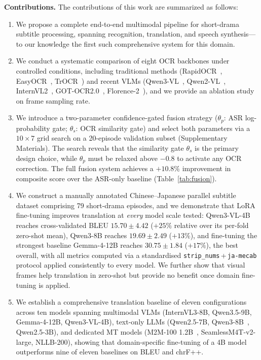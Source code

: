 \documentclass[mathematics,article,submit,xetex,moreauthors]{Definitions/mdpi}
\begin{document}
\textbf{Contributions.}
The contributions of this work are summarized as follows:
\begin{enumerate}
 \item We propose a complete end-to-end multimodal pipeline for short-drama subtitle processing, spanning recognition, translation, and speech synthesis---to our knowledge the first such comprehensive system for this domain.
 \item We conduct a systematic comparison of eight OCR backbones under controlled conditions, including traditional methods (RapidOCR~\cite{rapidocr2022}, EasyOCR~\cite{easyocr2020}, TrOCR~\cite{li2021trocr}) and recent VLMs (Qwen3-VL~\cite{qwen3vl2025}, Qwen2-VL~\cite{wang2024qwen2}, InternVL2~\cite{chen2024internvl}, GOT-OCR2.0~\cite{wang2024gotocr}, Florence-2~\cite{florence2_2024}), and we provide an ablation study on frame sampling rate.
 \item We introduce a two-parameter confidence-gated fusion strategy ($\theta_p$: ASR log-probability gate; $\theta_s$: OCR similarity gate) and select both parameters via a $10 \times 7$ grid search on a 20-episode validation subset (Supplementary Materials). The search reveals that the similarity gate $\theta_s$ is the primary design choice, while $\theta_p$ must be relaxed above $-0.8$ to activate any OCR correction. The full fusion system achieves a $+10.8\%$ improvement in composite score over the ASR-only baseline (Table~\ref{tab:fusion}).
 \item We construct a manually annotated Chinese--Japanese parallel subtitle dataset comprising 79 short-drama episodes, and we demonstrate that LoRA fine-tuning improves translation at \emph{every} model scale tested: Qwen3-VL-4B reaches cross-validated BLEU $15.70\pm4.42$ ($+25\%$ relative over its per-fold zero-shot mean), Qwen3-8B reaches $19.69\pm2.49$ ($+13\%$), and fine-tuning the strongest baseline Gemma-4-12B reaches $30.75\pm1.84$ ($+17\%$), the best overall, with all metrics computed via a standardised \texttt{strip\_nums}\,+\,\allowbreak\texttt{ja-mecab} protocol applied consistently to every model. We further show that visual frames help translation in zero-shot but provide no benefit once domain fine-tuning is applied.
 \item We establish a comprehensive translation baseline of eleven configurations across ten models spanning multimodal VLMs (InternVL3-8B, Qwen3.5-9B, Gemma-4-12B, Qwen3-VL-4B), text-only LLMs (Qwen2.5-7B, Qwen3-8B~\cite{qwen3_2025}, Qwen2.5-3B), and dedicated MT models (M2M-100 1.2B~\cite{fan2021beyond}, SeamlessM4T-v2-large, NLLB-200), showing that domain-specific fine-tuning of a 4B model outperforms nine of eleven baselines on BLEU and chrF++.

\end{enumerate}
\end{document}
